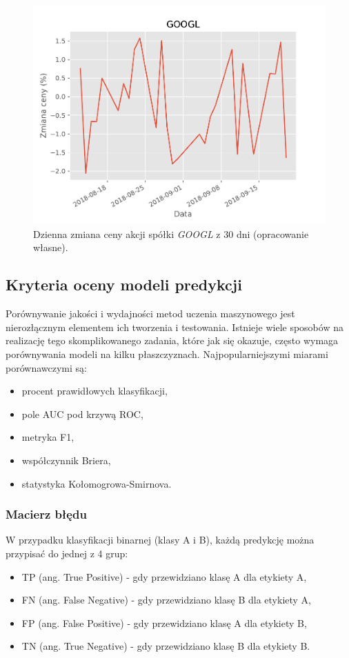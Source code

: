 \documentclass[a4paper, twoside, 11pt, openright]{article}
\begin{document}
\begin{figure}[H]
\centering \includegraphics[scale=0.9]{img/googl_pct_change_last_30}
\caption{Dzienna zmiana ceny akcji spółki \textit{GOOGL} z 30 dni (opracowanie własne).}
\label{img:googl_pct_change_last_30}
\end{figure}

\subsection{Kryteria oceny modeli predykcji}

Porównywanie jakości i wydajności metod uczenia maszynowego jest nierozłącznym elementem ich tworzenia i testowania. Istnieje wiele sposobów na realizację tego skomplikowanego zadania, które jak się okazuje, często wymaga porównywania modeli na kilku płaszczyznach. Najpopularniejszymi miarami porównawczymi są:
\begin{itemize}
\item procent prawidłowych klasyfikacji,
\item pole AUC pod krzywą ROC,
\item metryka F1,
\item współczynnik Briera,
\item statystyka Kołomogrowa-Smirnova.
\end{itemize}

\subsubsection{Macierz błędu}

W przypadku klasyfikacji binarnej (klasy A i B), każdą predykcję można przypisać do jednej z 4 grup:
\begin{itemize}
\item TP (ang. True Positive) - gdy przewidziano klasę A dla etykiety A,
\item FN (ang. False Negative) - gdy przewidziano klasę B dla etykiety A,
\item FP (ang. False Positive) - gdy przewidziano klasę A dla etykiety B,
\item TN (ang. True Negative) - gdy przewidziano klasę B dla etykiety B.
\end{itemize}
\end{document}
